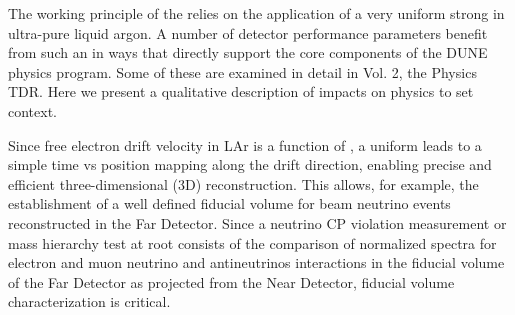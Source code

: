 



The working principle of the  relies on the application of a very uniform strong \efield in ultra-pure liquid argon.  A number of detector performance parameters benefit from such an \efield in ways that directly support the core components of the DUNE physics program.  Some of these are examined in detail in Vol. 2, the Physics TDR.  Here we present a qualitative description of \efield impacts on physics to set context.

Since free electron drift velocity in LAr is a function of \efield, a uniform \efield leads to a simple time vs position mapping along the drift direction, enabling precise and efficient three-dimensional (3D) reconstruction.  This allows, for example, the establishment of a well defined fiducial volume for beam neutrino events reconstructed in the Far Detector.  Since a neutrino CP violation measurement or mass hierarchy test at root consists of the comparison of normalized spectra for electron and muon neutrino and antineutrinos interactions in the fiducial volume of the Far Detector as projected from the Near Detector, fiducial volume characterization is critical.   

